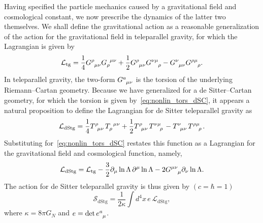 \documentclass[%
aps,
prd,
reprint
]{revtex4-1}
\newcommand{\ind}{\indices}
\def\pd{\partial}
\def\mc{\mathcal}
\def\mrm{\mathrm}
\begin{document}
Having specified the particle mechanics caused by a gravitational 
field and cosmological constant, we now prescribe the dynamics of 
the latter two themselves. We shall define the gravitational 
action as a reasonable generalization of the action for the 
gravitational field in teleparallel gravity, for which the 
Lagrangian is given by~\cite{Maluf:2013gaa}
\begin{equation*}
  \mc{L}_\mrm{tg} = \frac{1}{4} G \ind{^\rho_{\mu\nu}} 
  G\ind{_\rho^{\mu\nu}} + \frac{1}{2} G\ind{^\rho_{\mu\nu}} 
  G\ind{^{\nu\mu}_\rho} - G\ind{^\nu_{\mu\nu}} 
  G\ind{^{\rho\mu}_\rho}.
\end{equation*}
In teleparallel gravity, the two-form $G\ind{^a_{\mu\nu}}$ is the 
torsion of the underlying Riemann--Cartan geometry. Because we 
have generalized for a de Sitter--Cartan geometry, for which the 
torsion is given by~\eqref{eq:nonlin_tors_dSC}, it appears 
a natural proposition to define the Lagrangian for de Sitter 
teleparallel gravity as
\begin{equation*}
  \mc{L}_\mrm{dStg} = \frac{1}{4} T \ind{^\rho_{\mu\nu}} 
  T\ind{_\rho^{\mu\nu}} + \frac{1}{2} T\ind{^\rho_{\mu\nu}} 
  T\ind{^{\nu\mu}_\rho} - T\ind{^\nu_{\mu\nu}} 
  T\ind{^{\rho\mu}_\rho}.
\end{equation*}
Substituting for~\eqref{eq:nonlin_tors_dSC} restates this 
function as a Lagrangian for the gravitational field and 
cosmological function, namely,
\begin{equation}
\label{eq:lagrangian_dStg}
  \mc{L}_\mrm{dStg} = \mc{L}_\mrm{tg} - \frac{3}{2} \pd_\mu \ln 
  \Lambda\, \pd^\mu \ln \Lambda
  - 2 G\ind{^{\mu\nu}_\mu} \pd_\nu \ln \Lambda.
\end{equation}
The action for de Sitter teleparallel gravity is thus given by 
$(c = \hbar = 1)$
\begin{equation}
\label{eq:action_dStg}
  \mc{S}_\mrm{dStg} = \frac{1}{2\kappa} \int d^4 x \, e \, 
  \mc{L}_\mrm{dStg},
\end{equation}
where $\kappa = 8\pi G_N$ and $e = \det e\ind{^a_\mu}$.
\end{document}
